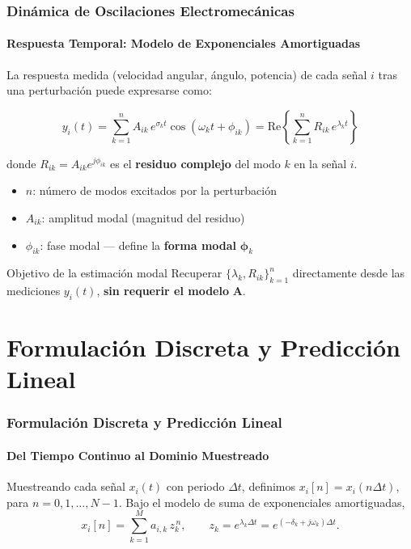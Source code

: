 \documentclass{beamer}
\begin{document}
\begin{frame}
\frametitle{Dinámica de Oscilaciones Electromecánicas}
\framesubtitle{Respuesta Temporal: Modelo de Exponenciales Amortiguadas}

La respuesta medida (velocidad angular, ángulo, potencia) de cada señal $i$ tras una perturbación puede expresarse como:

\begin{equation}
    y_i(t) = \sum_{k=1}^{n} A_{ik}\, e^{\sigma_k t}\cos(\omega_k t + \phi_{ik})
           = \mathrm{Re}\!\left\{\sum_{k=1}^{n} R_{ik}\, e^{\lambda_k t}\right\}
    \label{eq:response}
\end{equation}

donde $R_{ik} = A_{ik}e^{j\phi_{ik}}$ es el \textbf{residuo complejo} del modo $k$ en la señal $i$.

\vspace{0.4em}
\begin{itemize}
    \item $n$: número de modos excitados por la perturbación
    \item $A_{ik}$: amplitud modal (magnitud del residuo)
    \item $\phi_{ik}$: fase modal — define la \textbf{forma modal} $\bm{\phi}_k$
\end{itemize}



\end{frame}


\begin{frame}
    \begin{exampleblock}{Objetivo de la estimación modal}
    Recuperar $\{\lambda_k, R_{ik}\}_{k=1}^n$ directamente desde las mediciones $y_i(t)$,\textbf{ sin requerir el modelo} $\mathbf{A}$.
\end{exampleblock}
\end{frame}



\section{Formulación Discreta y Predicción Lineal}

\begin{frame}
\frametitle{Formulación Discreta y Predicción Lineal}
\framesubtitle{Del Tiempo Continuo al Dominio Muestreado}

Muestreando cada señal $x_i(t)$ con periodo $\Delta t$, definimos
$x_i[n] = x_i(n\Delta t)$, para $n = 0,1,\dots,N-1$. 
Bajo el modelo de suma de exponenciales amortiguadas,
\begin{equation}
    x_i[n] = \sum_{k=1}^{M} a_{i,k}\, z_k^{\,n}, \qquad
    z_k = e^{\lambda_k \Delta t} = e^{(-\delta_k + j\omega_k)\Delta t}.
    \label{eq:discrete}
\end{equation}

\end{frame}
\end{document}
